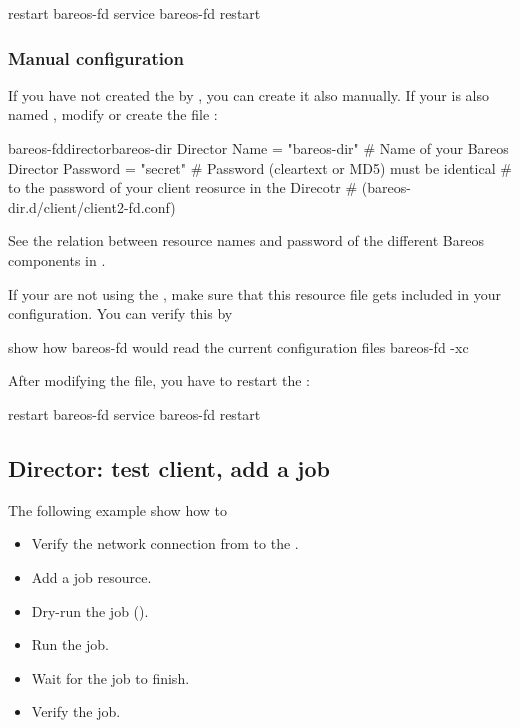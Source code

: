 \begin{commands}{restart bareos-fd}
service bareos-fd restart
\end{commands}

\subsubsection*{Manual configuration}

If you have not created the  by , you can create it also manually.
If your \bareosDir is also named , modify or create the file :

\begin{bareosConfigResource}{bareos-fd}{director}{bareos-dir}
Director {
  Name = "bareos-dir"   # Name of your Bareos Director
  Password = "secret"   # Password (cleartext or MD5) must be identical
                        # to the password of your client reosurce in the Direcotr
                        # (bareos-dir.d/client/client2-fd.conf)
}
\end{bareosConfigResource}

See the relation between resource names and password of the different Bareos components in .

If your are not using the ,
make sure that this resource file gets included in your \bareosFd configuration.
You can verify this by
\begin{commands}{show how bareos-fd would read the current configuration files}
bareos-fd -xc
\end{commands}

After modifying the file, you have to restart the \bareosFd:
\begin{commands}{restart bareos-fd}
service bareos-fd restart
\end{commands}



\subsection*{Director: test client, add a job}

The following example show how to
\begin{itemize}
    \item Verify the network connection from \bareosDir to the \bareosFd.
    \item Add a job resource.
    \item Dry-run the job ().
    \item Run the job.
    \item Wait for the job to finish.
    \item Verify the job.
\end{itemize}


